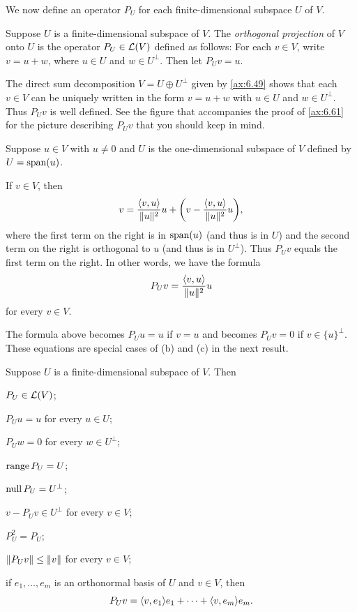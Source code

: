We now define an operator $P_U$ for each finite-dimensional subspace $U$ of
$V$.

\begin{definition}\label{ax:6.55}
Suppose $U$ is a finite-dimensional subspace of $V$. The \emph{orthogonal
projection} of $V$ onto $U$ is the operator $P_U\in\mathcal{L}(V)$ defined as follows:
For each $v\in V$, write $v=u+w$, where $u\in U$ and $w\in U^\perp$. Then let
$P_Uv=u$.
\end{definition}

The direct sum decomposition $V=U\oplus U^\perp$ given by \ref{ax:6.49} shows
that each $v\in V$ can be uniquely written in the form $v=u+w$ with $u\in U$
and $w\in U^\perp$. Thus $P_Uv$ is well defined. See the figure that
accompanies the proof of \ref{ax:6.61} for the picture describing $P_Uv$ that
you should keep in mind.

\begin{example}\label{ax:6.56}
Suppose $u\in V$ with $u\ne0$ and $U$ is the one-dimensional subspace of $V$
defined by $U=\operatorname{span}(u)$.

If $v\in V$, then
\[ v = \frac{\langle v, u \rangle}{\lVert u \rVert^2}u
     + \biggl(v-\frac{\langle v, u \rangle}{\lVert u \rVert^2}u\biggr), \]
where the first term on the right is in $\operatorname{span}(u)$ (and thus is in $U$) and the
second term on the right is orthogonal to $u$ (and thus is in $U^\perp$). Thus
$P_Uv$ equals the first term on the right. In other words, we have the formula
\[ P_Uv = \frac{\langle v, u \rangle}{\lVert u \rVert^2}u \]
for every $v\in V$.

The formula above becomes $P_Uu=u$ if $v=u$ and becomes $P_Uv=0$ if
$v\in\{u\}^\perp$. These equations are special cases of (b) and (c) in the next
result.
\end{example}

\begin{result}\label{ax:6.57}
Suppose $U$ is a finite-dimensional subspace of $V$. Then
\begin{parts}
\item $P_U\in\mathcal{L}(V)$;
\item $P_Uu=u$ for every $u\in U$;
\item $P_Uw=0$ for every $w\in U^\perp$;
\item $\operatorname{range} P_U=U$;
\item $\operatorname{null} P_U=U^\perp$;
\item $v-P_Uv\in U^\perp$ for every $v\in V$;
\item $P_U^2=P_U$;
\item $\lVert P_Uv \rVert\le\lVert v \rVert$ for every $v\in V$;
\item if $e_1,\dots,e_m$ is an orthonormal basis of $U$ and $v\in V$, then
  \[ P_Uv = \langle v, e_1 \rangle e_1+\cdots+\langle v, e_m \rangle e_m. \]
\end{parts}
\end{result}

